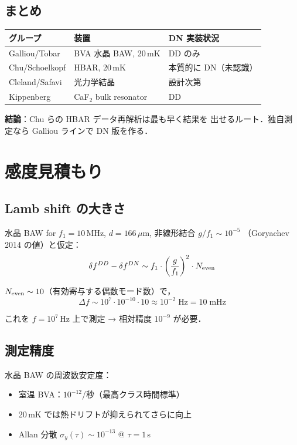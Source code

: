 \documentclass[11pt,a4paper]{article}
\begin{document}
\subsection{まとめ}

\begin{center}
\begin{tabular}{lll}
\toprule
グループ & 装置 & DN 実装状況 \\
\midrule
Galliou/Tobar & BVA 水晶 BAW, 20\,mK & DD のみ \\
Chu/Schoelkopf & HBAR, 20\,mK & 本質的に DN（未認識）\\
Cleland/Safavi & 光力学結晶 & 設計次第 \\
Kippenberg & CaF$_2$ bulk resonator & DD \\
\bottomrule
\end{tabular}
\end{center}

\textbf{結論}：Chu らの HBAR データ再解析は最も早く結果を
出せるルート．独自測定なら Galliou ラインで DN 版を作る．

\section{感度見積もり}

\subsection{Lamb shift の大きさ}

水晶 BAW for $f_1 = 10$\,MHz, $d = 166\,\mu$m, 非線形結合 $g/f_1 \sim 10^{-5}$
（Goryachev 2014 の値）と仮定：
\begin{equation}
  \delta f^{DD} - \delta f^{DN} \sim f_1 \cdot \left(\frac{g}{f_1}\right)^2 \cdot N_{\rm even}
\end{equation}

$N_{\rm even} \sim 10$（有効寄与する偶数モード数）で，
\begin{equation}
  \Delta f \sim 10^7 \cdot 10^{-10} \cdot 10 \approx 10^{-2}\;\text{Hz} = 10\;\text{mHz}
\end{equation}

これを $f = 10^7$\,Hz 上で測定 → 相対精度 $10^{-9}$ が必要．

\subsection{測定精度}

水晶 BAW の周波数安定度：
\begin{itemize}
\item 室温 BVA：$10^{-12}$/秒（最高クラス時間標準）
\item 20\,mK では熱ドリフトが抑えられてさらに向上
\item Allan 分散 $\sigma_y(\tau) \sim 10^{-13}$ @ $\tau=1$\,s
\end{itemize}
\end{document}
